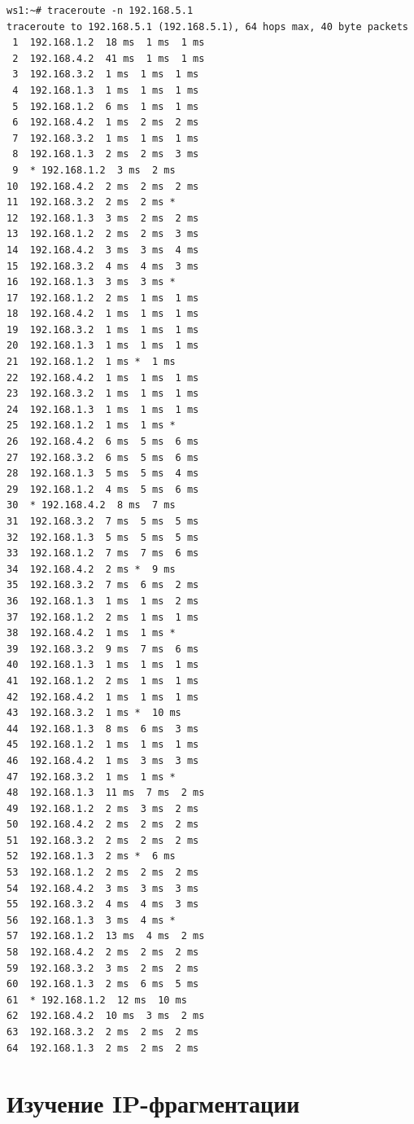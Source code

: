 \documentclass[a4paper,12pt]{article}
\begin{document}
\begin{Verbatim}
ws1:~# traceroute -n 192.168.5.1
traceroute to 192.168.5.1 (192.168.5.1), 64 hops max, 40 byte packets
 1  192.168.1.2  18 ms  1 ms  1 ms
 2  192.168.4.2  41 ms  1 ms  1 ms
 3  192.168.3.2  1 ms  1 ms  1 ms
 4  192.168.1.3  1 ms  1 ms  1 ms
 5  192.168.1.2  6 ms  1 ms  1 ms
 6  192.168.4.2  1 ms  2 ms  2 ms
 7  192.168.3.2  1 ms  1 ms  1 ms
 8  192.168.1.3  2 ms  2 ms  3 ms
 9  * 192.168.1.2  3 ms  2 ms
10  192.168.4.2  2 ms  2 ms  2 ms
11  192.168.3.2  2 ms  2 ms *
12  192.168.1.3  3 ms  2 ms  2 ms
13  192.168.1.2  2 ms  2 ms  3 ms
14  192.168.4.2  3 ms  3 ms  4 ms
15  192.168.3.2  4 ms  4 ms  3 ms
16  192.168.1.3  3 ms  3 ms *
17  192.168.1.2  2 ms  1 ms  1 ms
18  192.168.4.2  1 ms  1 ms  1 ms
19  192.168.3.2  1 ms  1 ms  1 ms
20  192.168.1.3  1 ms  1 ms  1 ms
21  192.168.1.2  1 ms *  1 ms
22  192.168.4.2  1 ms  1 ms  1 ms
23  192.168.3.2  1 ms  1 ms  1 ms
24  192.168.1.3  1 ms  1 ms  1 ms
25  192.168.1.2  1 ms  1 ms *
26  192.168.4.2  6 ms  5 ms  6 ms
27  192.168.3.2  6 ms  5 ms  6 ms
28  192.168.1.3  5 ms  5 ms  4 ms
29  192.168.1.2  4 ms  5 ms  6 ms
30  * 192.168.4.2  8 ms  7 ms
31  192.168.3.2  7 ms  5 ms  5 ms
32  192.168.1.3  5 ms  5 ms  5 ms
33  192.168.1.2  7 ms  7 ms  6 ms
34  192.168.4.2  2 ms *  9 ms
35  192.168.3.2  7 ms  6 ms  2 ms
36  192.168.1.3  1 ms  1 ms  2 ms
37  192.168.1.2  2 ms  1 ms  1 ms
38  192.168.4.2  1 ms  1 ms *
39  192.168.3.2  9 ms  7 ms  6 ms
40  192.168.1.3  1 ms  1 ms  1 ms
41  192.168.1.2  2 ms  1 ms  1 ms
42  192.168.4.2  1 ms  1 ms  1 ms
43  192.168.3.2  1 ms *  10 ms
44  192.168.1.3  8 ms  6 ms  3 ms
45  192.168.1.2  1 ms  1 ms  1 ms
46  192.168.4.2  1 ms  3 ms  3 ms
47  192.168.3.2  1 ms  1 ms *
48  192.168.1.3  11 ms  7 ms  2 ms
49  192.168.1.2  2 ms  3 ms  2 ms
50  192.168.4.2  2 ms  2 ms  2 ms
51  192.168.3.2  2 ms  2 ms  2 ms
52  192.168.1.3  2 ms *  6 ms
53  192.168.1.2  2 ms  2 ms  2 ms
54  192.168.4.2  3 ms  3 ms  3 ms
55  192.168.3.2  4 ms  4 ms  3 ms
56  192.168.1.3  3 ms  4 ms *
57  192.168.1.2  13 ms  4 ms  2 ms
58  192.168.4.2  2 ms  2 ms  2 ms
59  192.168.3.2  3 ms  2 ms  2 ms
60  192.168.1.3  2 ms  6 ms  5 ms
61  * 192.168.1.2  12 ms  10 ms
62  192.168.4.2  10 ms  3 ms  2 ms
63  192.168.3.2  2 ms  2 ms  2 ms
64  192.168.1.3  2 ms  2 ms  2 ms
\end{Verbatim}


\section{Изучение IP-фрагментации}
\end{document}
